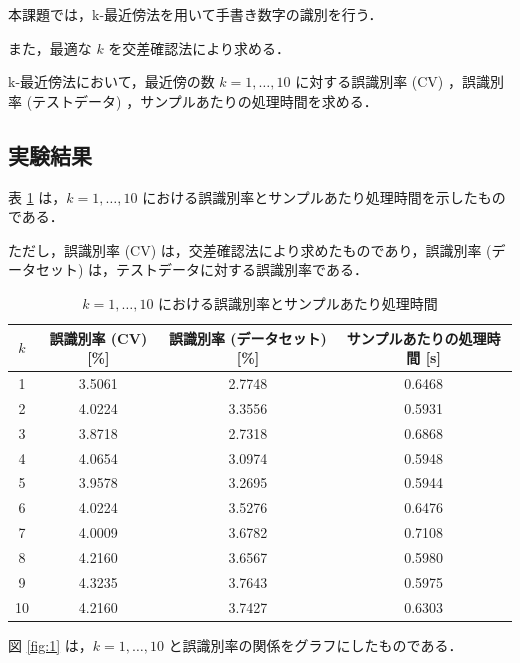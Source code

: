 \documentclass[fleqn, a4paper. 12pt]{jsarticle}
\begin{document}
      本課題では，k-最近傍法を用いて手書き数字の識別を行う．

      また，最適な $k$ を交差確認法により求める．
      
      k-最近傍法において，最近傍の数 $k = 1, \dots, 10$ に対する誤識別率 (CV) ，誤識別率 (テストデータ) ，サンプルあたりの処理時間を求める．
      
    \subsection{実験結果}
    
      表 \ref{tab:1} は，$k = 1, \dots, 10$ における誤識別率とサンプルあたり処理時間を示したものである．

      ただし，誤識別率 (CV) は，交差確認法により求めたものであり，誤識別率 (データセット) は，テストデータに対する誤識別率である．

      \begin{table}[p]
        \centering
        \caption{$k = 1, \dots, 10$ における誤識別率とサンプルあたり処理時間}
        \begin{tabular}{|c|c|c|c|}
          \hline
          $k$ & 誤識別率 (CV) [\%] & 誤識別率 (データセット) [\%] & サンプルあたりの処理時間 [s] \\
          \hline
          1 & 3.5061 & 2.7748 & 0.6468 \\
          2 & 4.0224 & 3.3556 & 0.5931 \\
          3 & 3.8718 & 2.7318 & 0.6868 \\
          4 & 4.0654 & 3.0974 & 0.5948 \\
          5 & 3.9578 & 3.2695 & 0.5944 \\
          6 & 4.0224 & 3.5276 & 0.6476 \\
          7 & 4.0009 & 3.6782 & 0.7108 \\
          8 & 4.2160 & 3.6567 & 0.5980 \\
          9 & 4.3235 & 3.7643 & 0.5975 \\
          10 & 4.2160 & 3.7427 & 0.6303 \\
          \hline
        \end{tabular}
        \label{tab:1}
      \end{table}

      \quad

      図 \ref{fig:1} は，$k = 1, \dots, 10$ と誤識別率の関係をグラフにしたものである．
\end{document}
